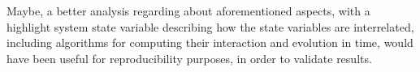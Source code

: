\documentclass[sigchi]{acmart}
\begin{document}
Maybe, a better analysis regarding about aforementioned aspects, with a highlight system state variable describing how the state variables are interrelated, including algorithms for computing their interaction and evolution in time, would have been useful for reproducibility purposes, in order to  validate \citet{MSAReport} results.




\appendix
\end{document}
